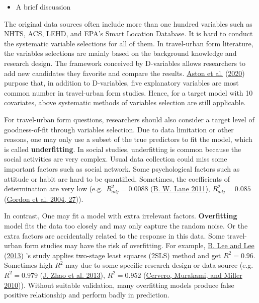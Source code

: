 \documentclass[
  11pt,
  openany]{memoir}
\providecommand{\tightlist}{%
  \setlength{\itemsep}{0pt}\setlength{\parskip}{0pt}}
\begin{document}
\begin{itemize}
\tightlist
\item
  A brief discussion
\end{itemize}

The original data sources often include more than one hundred variables such as NHTS, ACS, LEHD, and EPA's Smart Location Database.
It is hard to conduct the systematic variable selections for all of them.
In travel-urban form literature, the variables selections are mainly based on the background knowledge and research design.
The framework conceived by D-variables allows researchers to add new candidates they favorite and compare the results.
\protect\hyperlink{ref-astonStudyDesignImpacts2020}{Aston et al.} (\protect\hyperlink{ref-astonStudyDesignImpacts2020}{2020}) purpose that, in addition to D-variables, five explanatory variables are most common number in travel-urban form studies.
Hence, for a target model with 10 covariates, above systematic methods of variables selection are still applicable.

For travel-urban form questions, researchers should also consider a target level of goodness-of-fit through variables selection.
Due to data limitation or other reasons, one may only use a subset of the true predictors to fit the model, which is called \textbf{underfitting}.
In social studies, underfitting is common because the social activities are very complex. Usual data collection could miss some important factors such as social network. Some psychological factors such as attitude or habit are hard to be quantified.
Sometimes, the coefficients of determination are very low (e.g.~\(R^2_{adj} = 0.0088\) (\protect\hyperlink{ref-laneTAZlevelVariationWork2011}{B. W. Lane 2011}), \(R^2_{adj} = 0.085\) (\protect\hyperlink{ref-gordonNeighborhoodAttributesCommuting2004}{Gordon et al. 2004, 27})).

In contrast, One may fit a model with extra irrelevant factors. \textbf{Overfitting} model fits the data too closely and may only capture the random noise.
Or the extra factors are accidentally related to the response in this data.
Some travel-urban form studies may have the risk of overfitting. For example, \protect\hyperlink{ref-leeComplementaryPricingLand2013}{B. Lee and Lee} (\protect\hyperlink{ref-leeComplementaryPricingLand2013}{2013}) 's study applies two-stage least squares (2SLS) method and get \(R^2 = 0.96\). Sometimes high \(R^2\) may due to some specific research design or data source (e.g.~\(R^2 = 0.979\) (\protect\hyperlink{ref-zhaoWhatInfluencesMetro2013}{J. Zhao et al. 2013}), \(R^2 = 0.952\) (\protect\hyperlink{ref-cerveroDirectRidershipModel2010}{Cervero, Murakami, and Miller 2010})).
Without suitable validation, many overfitting models produce false positive relationship and perform badly in prediction.
\end{document}
